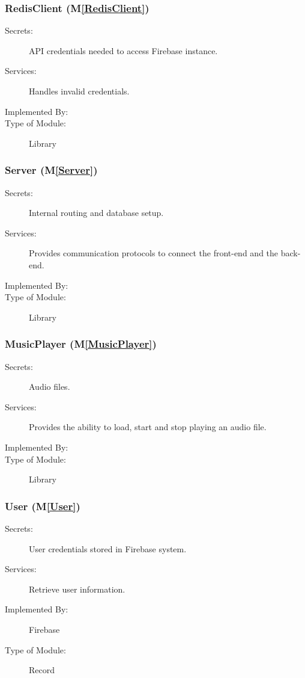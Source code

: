 \documentclass[12pt, titlepage]{article}
\newcommand{\mref}[1]{M\ref{#1}}
\begin{document}
\subsubsection{RedisClient (\mref{RedisClient})}

\begin{description}
\item[Secrets:] API credentials needed to access Firebase instance.
\item[Services:] Handles invalid credentials.
\item[Implemented By:]  \progname
\item[Type of Module:] Library
\end{description}

\subsubsection{Server (\mref{Server})}

\begin{description}
\item[Secrets:] Internal routing and database setup.
\item[Services:] Provides communication protocols to connect the front-end and the back-end.
\item[Implemented By:]  \progname
\item[Type of Module:] Library
\end{description}

\subsubsection{MusicPlayer (\mref{MusicPlayer})}

\begin{description}
\item[Secrets:] Audio files.
\item[Services:] Provides the ability to load, start and stop playing an audio file.
\item[Implemented By:]  \progname
\item[Type of Module:] Library
\end{description}

\subsubsection{User (\mref{User})}

\begin{description}
\item[Secrets:] User credentials stored in Firebase system.
\item[Services:] Retrieve user information.
\item[Implemented By:]  Firebase
\item[Type of Module:] Record
\end{description}
\end{document}
